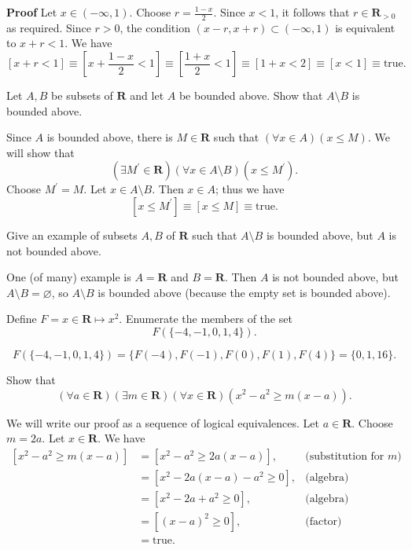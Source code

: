 \documentclass[12pt,fleqn,answers]{exam}
\newcommand{\reals}{\mathbf{R}}
\newcommand{\true}{\mbox{true}}
\begin{document}
\begin{questions}
\begin{solution}
  \textbf{Proof} Let $x \in (-\infty, 1) $. Choose $r = \frac{1-x}{2}$. Since  $x < 1$,
  it follows that $r \in  \reals_{>0}$ as required. Since $ r > 0$, the condition
  \( (x-r,x+r) \subset (-\infty, 1)\) is equivalent to $x + r < 1$.
  We have
  \[
    \left[x + r < 1 \right] \equiv  \left[x +  \frac{1-x}{2} < 1 \right]
    \equiv \left[\frac{1+x}{2} < 1 \right] \equiv \left[1+x < 2 \right]
    \equiv \left[ x < 1 \right] \equiv \true.
  \]
\end{solution}

\question Let $A,B$ be subsets of $\reals$ and let $A$ be bounded above.
Show that $A \setminus B$ is bounded above.

\begin{solution}
  Since $A$ is bounded above, there is $M \in \reals$ such that
  $(\forall x \in A)(x \leq M)$.  We will show that
  \[
    (\exists M^\prime \in \reals)(\forall x \in A \setminus B)(x \leq M^\prime).
  \]
  Choose $M^\prime= M$. Let $x \in A \setminus B$. Then $x \in A$; thus we have
  \[
     [x \leq M^\prime]  \equiv [x \leq M] \equiv \true.
  \]


\end{solution}

\question Give an example of subsets $A,B$ of $\reals$
such that $A \setminus B$ is bounded above, but $A$ is not bounded
above.

\begin{solution}
  One (of many) example is $A = \reals$ and $B = \reals$. Then
  $A$ is not bounded above, but $A \setminus B = \varnothing$,
  so  $A \setminus B$ is bounded above (because the empty set is bounded above).
\end{solution}

\question Define $F = x \in \reals \mapsto x^2$.  Enumerate the members of the set
\begin{equation*}
  F(\{-4,-1,0,1,4 \}).
\end{equation*}
\begin{solution}
  \[
    F(\{-4,-1,0,1,4 \}) = \{F(-4),F(-1),F(0),F(1),F(4) \} =
     \{0,1,16\}.
  \]
\end{solution}


\question Show that
\[
    \left(\forall a \in \reals \right) \left(\exists m \in \reals \right)
    \left(\forall x \in \reals \right) \left(x^2 - a^2 \geq m (x-a) \right).
\]
\begin{solution}
  We will write our proof as a sequence of logical 
  equivalences.   Let $a \in \reals$. Choose $m = 2 a$. Let $x \in \reals$. We have
  \begin{align*}
    \left [x^2 - a^2 \geq m (x-a) \right ] &=
    \left [x^2 - a^2 \geq 2a  (x-a) \right ], &\mbox{(substitution for $m$)} \\
    &=
    \left [x^2 -2 a (x-a) - a^2 \geq 0 \right ],  &\mbox{(algebra)}\\
    &=
    \left [x^2 -2 a  + a^2 \geq 0 \right ], &\mbox{(algebra)} \\
    &=
    \left [(x - a)^2 \geq 0 \right ], &\mbox{(factor)} \\
    &=
    \true.
  \end{align*}
  

\end{solution}
\end{questions}
\end{document}
